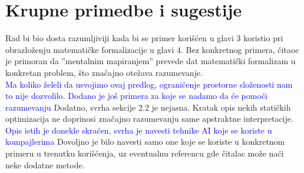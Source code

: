 \documentclass[a4paper]{report}
\newcommand{\odgovor}[1]{\textcolor{blue}{#1}}
\begin{document}
\section{Krupne primedbe i sugestije}
Rad bi bio dosta razumljiviji kada bi se primer korišćen u glavi 3 koristio pri obrazloženju matematičke formalizacije u glavi 4. Bez konkretnog primera,
čitaoc je primoran da ''mentalnim mapiranjem''  prevede dat matematički formalizam u konkretan problem, što značajno otežava razumevanje.
\\
\odgovor{Ma koliko želeli da usvojimo ovaj predlog, ograničenje prostorne složenosti nam to nije dozvolilo. Dodano je još primera za koje se nadamo da će pomoći razumevanju}
Dodatno, svrha sekcije 2.2 je nejasna. Kratak opis nekih statičkih optimizacija ne doprinosi značajno razumevanju same apstraktne interpretacije. 
\odgovor{Opis istih je donekle skraćen, svrha je navesti tehnike AI koje se koriste u kompajlerima}
Dovoljno je bilo navesti samo one koje se koriste u konkretnom primeru u trenutku korišćenja, uz eventualnu referencu gde čitalac može naći neke dodatne metode. 
\end{document}
